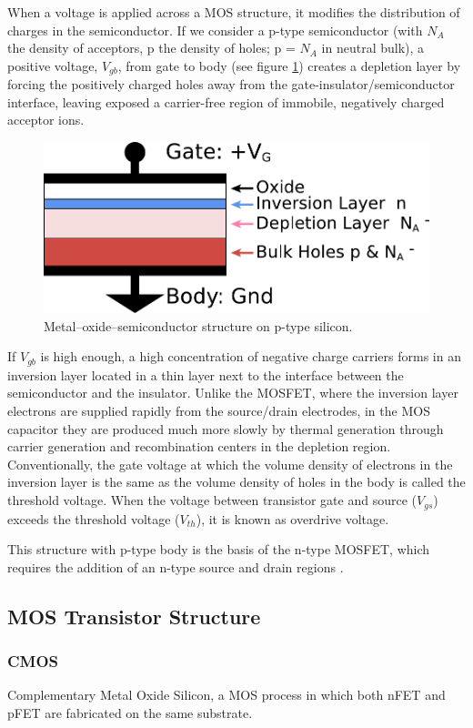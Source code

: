 \documentclass[main]{subfiles}
\begin{document}
When a voltage is applied across a MOS structure, it modifies the distribution of charges in the semiconductor. If we consider a p-type semiconductor (with $N_A$ the density of acceptors, p the density of holes; p = $N_A$ in neutral bulk), a positive voltage, $V_{gb}$, from gate to body (see figure \ref{fig:MOS_Structure}) creates a depletion layer by forcing the positively charged holes away from the gate-insulator/semiconductor interface, leaving exposed a carrier-free region of immobile, negatively charged acceptor ions.
\begin{figure}[H]
\centering
\includegraphics[width=0.6\linewidth]{figs/MOS_Capacitor.pdf}
\caption{Metal–oxide–semiconductor structure on p-type silicon.}
\label{fig:MOS_Structure}
\end{figure}
 If $V_{gb}$ is high enough, a high concentration of negative charge carriers forms in an inversion layer located in a thin layer next to the interface between the semiconductor and the insulator. Unlike the MOSFET, where the inversion layer electrons are supplied rapidly from the source/drain electrodes, in the MOS capacitor they are produced much more slowly by thermal generation through carrier generation and recombination centers in the depletion region. Conventionally, the gate voltage at which the volume density of electrons in the inversion layer is the same as the volume density of holes in the body is called the threshold voltage. When the voltage between transistor gate and source ($V_{gs}$) exceeds the threshold voltage ($V_{th}$), it is known as overdrive voltage.

This structure with p-type body is the basis of the n-type MOSFET, which requires the addition of an n-type source and drain regions \cite{wiki:MOSFET}.

\subsection{MOS Transistor Structure}

\subsubsection{CMOS}  Complementary Metal Oxide Silicon, a MOS process in which both nFET and pFET are fabricated on the same substrate.
\end{document}
